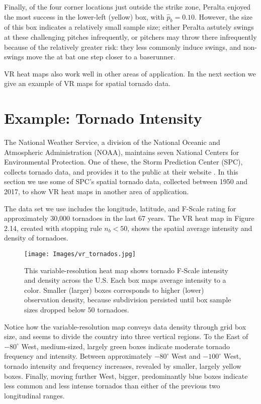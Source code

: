 Finally, of the four corner locations just outside the strike zone, Peralta enjoyed the most success in the lower-left (yellow) box, with $\hat{p}_{b} = 0.10$. However, the size of this box indicates a relatively small sample size; either Peralta astutely swings at these challenging pitches infrequently, or pitchers may throw there infrequently because of the relatively greater risk: they less commonly induce swings, and non-swings move the at bat one step closer to a baserunner. 

VR heat maps also work well in other areas of application. In the next section we give an example of VR maps for spatial tornado data.

\section{Example: Tornado Intensity}

The National Weather Service, a division of the National Oceanic and Atmospheric Administration (NOAA), maintains seven National Centers for Environmental Protection. One of these, the Storm Prediction Center (SPC), collects tornado data, and provides it to the public at their website \citep{NOAA}. In this section we use some of SPC's spatial tornado data, collected between 1950 and 2017, to show VR heat maps in another area of application. 

The data set we use includes the longitude, latitude, and F-Scale rating for approximately 30,000 tornadoes in the last 67 years. The VR heat map in Figure 2.14, created with stopping rule $n_{b} < 50$, shows the spatial average intensity and density of tornadoes.
        \begin{figure}[H]
      	\centering      
      	\texttt{[image: Images/vr\_tornados.jpg]}
      	\caption{This variable-resolution heat map shows tornado F-Scale intensity and density across the U.S. Each box maps average intensity to a color. Smaller (larger) boxes corresponds to higher (lower) observation density, because subdivision persisted until box sample sizes dropped below 50 tornadoes.}
        \end{figure}
Notice how the variable-resolution map conveys data density through grid box size, and seems to divide the country into three vertical regions. To the East of $-80^{\circ}$ West, medium-sized, largely green boxes indicate moderate tornado frequency and intensity. Between approximately $-80^{\circ}$ West and $-100^{\circ}$ West, tornado intensity and frequency increases, revealed by smaller, largely yellow boxes. Finally, moving further West, bigger, predominantly blue boxes indicate less common and less intense tornados than either of the previous two longitudinal ranges.

